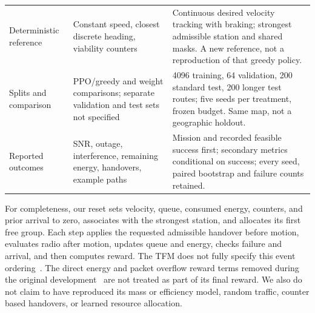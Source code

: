 {\begin{tabular}{@{}p{}p{}p{}@{}}
Deterministic reference & Constant speed, closest discrete heading, viability
counters~\cite[pp.~13--14, Sec.~5.4]{thesis}
& Continuous desired velocity tracking with braking; strongest admissible
station and shared masks. A new reference, not a reproduction of that greedy policy. \\
Splits and comparison & PPO/greedy and weight comparisons; separate validation
and test sets not specified~\cite[pp.~15--16, Secs.~6.2--6.3]{thesis}
& 4096 training, 64 validation, 200 standard test, 200 longer test routes;
five seeds per treatment, frozen budget. Same map, not a geographic holdout. \\
Reported outcomes & SNR, outage, interference, remaining energy, handovers,
example paths~\cite[pp.~16--20, Sec.~7]{thesis}
& Mission and recorded feasible success first; secondary metrics conditional
on success; every seed, paired bootstrap and failure counts retained. \\
\bottomrule
\end{tabular}
}

For completeness, our reset sets velocity, queue, consumed energy, counters,
and prior arrival to zero, associates with the strongest station, and allocates
its first free group. Each step applies the requested admissible handover before
motion, evaluates radio after motion, updates queue and energy, checks failure
and arrival, and then computes reward. The TFM does not fully specify this
event ordering~\cite[pp.~9--12, Secs.~3.2--5.2]{thesis}.
The direct energy and packet overflow reward terms removed during the original
development~\cite[pp.~20--21, Sec.~7.3]{thesis} are not treated as part of its
final reward. We also do not claim to have reproduced its mass or efficiency
model, random traffic, counter based handovers, or learned resource allocation.

